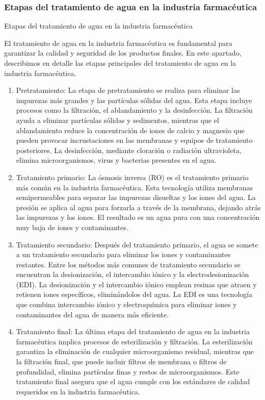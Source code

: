 \subsubsection{Etapas del tratamiento de agua en la industria farmacéutica}

Etapas del tratamiento de agua en la industria farmacéutica

El tratamiento de agua en la industria farmacéutica es fundamental para garantizar la calidad y seguridad de los productos finales. En este apartado, describimos en detalle las etapas principales del tratamiento de agua en la industria farmacéutica.

\begin{enumerate}
    \item Pretratamiento: La etapa de pretratamiento se realiza para eliminar las impurezas más grandes y las partículas sólidas del agua. Esta etapa incluye procesos como la filtración, el ablandamiento y la desinfección. La filtración ayuda a eliminar partículas sólidas y sedimentos, mientras que el ablandamiento reduce la concentración de iones de calcio y magnesio que pueden provocar incrustaciones en las membranas y equipos de tratamiento posteriores. La desinfección, mediante cloración o radiación ultravioleta, elimina microorganismos, virus y bacterias presentes en el agua.

    \item Tratamiento primario: La ósmosis inversa (RO) es el tratamiento primario más común en la industria farmacéutica. Esta tecnología utiliza membranas semipermeables para separar las impurezas disueltas y los iones del agua. La presión se aplica al agua para forzarla a través de la membrana, dejando atrás las impurezas y los iones. El resultado es un agua pura con una concentración muy baja de iones y contaminantes.

    \item Tratamiento secundario: Después del tratamiento primario, el agua se somete a un tratamiento secundario para eliminar los iones y contaminantes restantes. Entre los métodos más comunes de tratamiento secundario se encuentran la desionización, el intercambio iónico y la electrodesionización (EDI). La desionización y el intercambio iónico emplean resinas que atraen y retienen iones específicos, eliminándolos del agua. La EDI es una tecnología que combina intercambio iónico y electroquímica para eliminar iones y contaminantes del agua de manera más eficiente.
   
    \item Tratamiento final: La última etapa del tratamiento de agua en la industria farmacéutica implica procesos de esterilización y filtración. La esterilización garantiza la eliminación de cualquier microorganismo residual, mientras que la filtración final, que puede incluir filtros de membrana o filtros de profundidad, elimina partículas finas y restos de microorganismos. Este tratamiento final asegura que el agua cumple con los estándares de calidad requeridos en la industria farmacéutica.

\end{enumerate}




